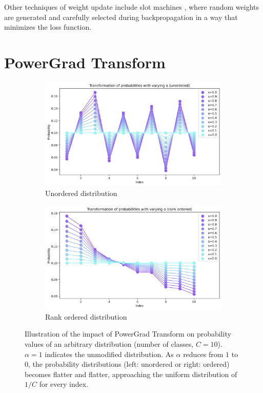 \documentclass[times,sort&compress]{elsarticle}
\begin{document}
Other techniques of weight update include slot machines \cite{aladago2021slot}, where
random weights are generated and carefully selected during backpropagation in a way that
minimizes the loss function.









\section{PowerGrad Transform}
\label{sec:Powe}


\begin{figure}[t]
\centering
\begin{subfigure}{.5\columnwidth}
\centering
\includegraphics[width=0.96\columnwidth]{prob_transform_unordered}
\caption{Unordered distribution}
\end{subfigure}%
\begin{subfigure}{.5\columnwidth}
\centering
\includegraphics[width=0.96\columnwidth]{prob_transform_ordered}
\caption{Rank ordered distribution}
\end{subfigure}
\caption{ Illustration of the impact of PowerGrad Transform on probability values of an
arbitrary distribution (number of classes, $C=10$). $\alpha=1$ indicates the unmodified
distribution. As $\alpha$ reduces from $1$ to $0$, the probability distributions (left:
unordered or right: ordered) becomes flatter and flatter, approaching the uniform
distribution of $1/C$ for every index. }
\label{fig:prob_plots}
\end{figure}
\end{document}
